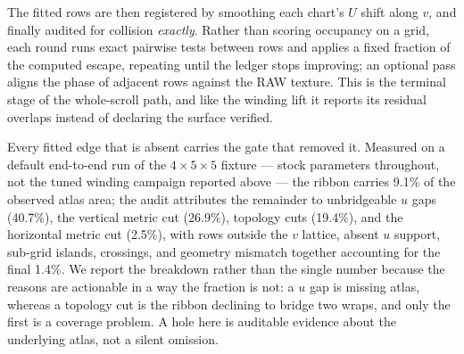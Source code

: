 The fitted rows are then registered by smoothing each chart's $U$ shift along $v$, and finally audited for collision {\em exactly}. Rather than scoring occupancy on a grid, each round runs exact pairwise tests between rows and applies a fixed fraction of the computed escape, repeating until the ledger stops improving; an optional pass aligns the phase of adjacent rows against the RAW texture. This is the terminal stage of the whole-scroll path, and like the winding lift it reports its residual overlaps instead of declaring the surface verified.

Every fitted edge that is absent carries the gate that removed it. Measured on a default end-to-end run of the $4\times5\times5$ fixture --- stock parameters throughout, not the tuned winding campaign reported above --- the ribbon carries 9.1\% of the observed atlas area; the audit attributes the remainder to unbridgeable $u$ gaps (40.7\%), the vertical metric cut (26.9\%), topology cuts (19.4\%), and the horizontal metric cut (2.5\%), with rows outside the $v$ lattice, absent $u$ support, sub-grid islands, crossings, and geometry mismatch together accounting for the final 1.4\%. We report the breakdown rather than the single number because the reasons are actionable in a way the fraction is not: a $u$ gap is missing atlas, whereas a topology cut is the ribbon declining to bridge two wraps, and only the first is a coverage problem. A hole here is auditable evidence about the underlying atlas, not a silent omission.

